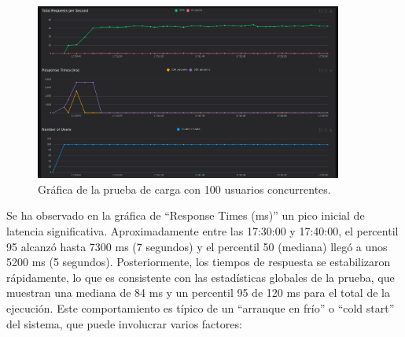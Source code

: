 \begin{figure}[H]
\centering
\includegraphics[width=0.9\textwidth]{figures/08_100_1.png}
\caption{Gráfica de la prueba de carga con 100 usuarios concurrentes.}
\label{fig:locust100}
\end{figure}

Se ha observado en la gráfica de ``Response Times (ms)'' un pico inicial de latencia significativa. Aproximadamente entre las 17:30:00 y 17:40:00, el percentil 95 alcanzó hasta 7300 ms (7 segundos) y el percentil 50 (mediana) llegó a unos 5200 ms (5 segundos). Posteriormente, los tiempos de respuesta se estabilizaron rápidamente, lo que es consistente con las estadísticas globales de la prueba, que muestran una mediana de 84 ms y un percentil 95 de 120 ms para el total de la ejecución.
\newline\newline
Este comportamiento es típico de un ``arranque en frío'' o ``cold start'' del sistema, que puede involucrar varios factores:

